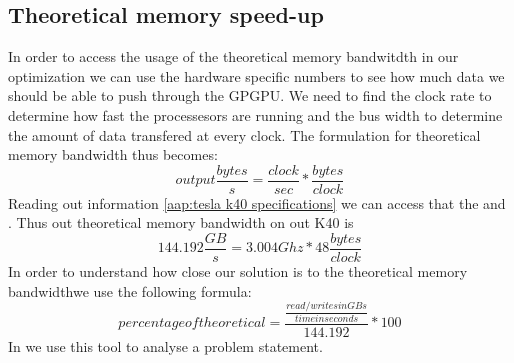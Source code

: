 \subsection{Theoretical memory speed-up}
\label{sec:analysing hardware}
In order to access the usage of the theoretical memory bandwitdth in our optimization we can use the hardware specific numbers to see how much data we should be able to push through the GPGPU.
We need to find the clock rate to determine how fast the processesors are running and the bus width to determine the amount of data transfered at every clock.
The formulation for theoretical memory bandwidth thus becomes:
\begin{equation*}
output \frac{bytes}{s} = \frac{clock}{sec} * \frac{bytes}{clock}
\end{equation*}
Reading out  information \cref{aap:tesla k40 specifications} we can access that the  and .
Thus out theoretical memory bandwidth on out K40 is
\begin{equation*}
144.192 \frac{GB}{s} = 3.004 Ghz * 48 \frac{bytes}{clock}
\end{equation*}
In order to understand how close our solution is to the theoretical memory bandwidthwe use the following formula:
\begin{equation*}
percentage of theoretical = \frac{\frac{read/writes in GBs}{time in seconds}}{144.192} * 100
\end{equation*}
In  we use this tool to analyse a problem statement.

